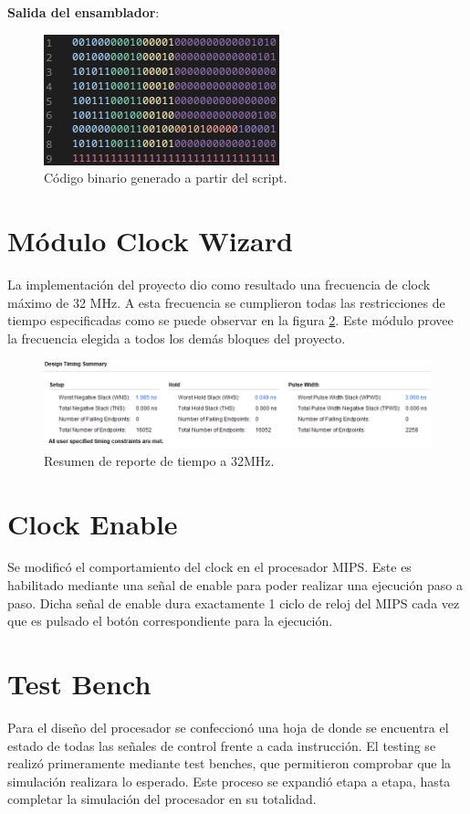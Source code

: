 \documentclass[12pt,A4paper,titlepage]{article}
\begin{document}
\noindent \textbf{Salida del ensamblador}:
\begin{figure}[H]
    \centering
    \includegraphics[scale=1.0]{figure/Output-bin.png}
    \caption{Código binario generado a partir del script.}
    \label{fig:my_label}
\end{figure}

\section{Módulo Clock Wizard}
La implementación del proyecto dio como resultado una frecuencia de clock máximo de 32 MHz. A esta frecuencia se cumplieron todas las restricciones de tiempo especificadas como se puede observar en la figura \ref{fig:timing-rep}. Este módulo provee la frecuencia elegida a todos los demás bloques del proyecto.

\begin{figure} [H]
    \centering
    \includegraphics[width=\textwidth]{figure/32MHz-timing-report.png}
    \caption{Resumen de reporte de tiempo a 32MHz.}
    \label{fig:timing-rep}
\end{figure}

\section{Clock Enable}
Se modificó el comportamiento del clock en el procesador MIPS. Este es habilitado mediante una señal de enable para poder realizar una ejecución paso a paso. Dicha señal de enable dura exactamente 1 ciclo de reloj del MIPS cada vez que es pulsado el botón correspondiente para la ejecución.

\section{Test Bench}
Para el diseño del procesador se confeccionó una hoja de donde se encuentra el estado de todas las señales de control frente a cada instrucción.
El testing se realizó primeramente mediante test benches, que permitieron comprobar que la simulación realizara lo esperado. Este proceso se expandió etapa a etapa, hasta completar la simulación del procesador en su totalidad.
\end{document}
